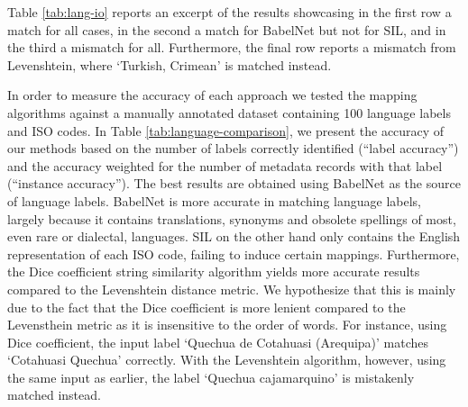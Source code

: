 \documentclass[11pt]{article}
\begin{document}

Table \ref{tab:lang-io} reports an excerpt of the results showcasing in the
first row a
match for all cases, in the second  a match for BabelNet but not for SIL, and
in the third
a mismatch for all. Furthermore, the final row reports a mismatch from Levenshtein,
where `Turkish, Crimean' is matched instead.

In order to measure the accuracy of each approach we tested the mapping
algorithms against a manually annotated dataset containing 100 language labels
and ISO codes.
In Table \ref{tab:language-comparison}, we present the accuracy of our methods
based on the number of labels correctly identified (``label accuracy'') and
the accuracy weighted for the number of
metadata records with that label (``instance accuracy'').
The best results are
obtained using BabelNet as the source of language labels. BabelNet is more
accurate in matching language labels, largely because it contains translations,
synonyms and obsolete spellings of most, even rare or dialectal, languages. SIL
on the other hand only contains the English representation of each ISO code,
failing to induce certain mappings. Furthermore, the Dice coefficient string
similarity algorithm yields more accurate results compared to the Levenshtein
distance metric. We hypothesize that this is mainly due to the fact that the
Dice coefficient is more lenient compared to the Levensthein metric as it is
insensitive to the order of words. For instance, using Dice coefficient, the
input label `Quechua de Cotahuasi (Arequipa)' matches `Cotahuasi Quechua'
correctly. With the Levenshtein algorithm, however, using the same input as
earlier, the label `Quechua cajamarquino' is mistakenly matched instead.
\end{document}
